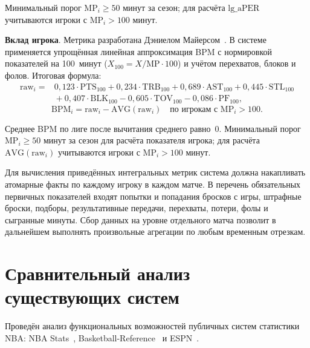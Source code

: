 Минимальный порог $\mathrm{MP}_i \ge 50$ минут за сезон; для расчёта
$\mathrm{lg\_aPER}$ учитываются игроки с $\mathrm{MP}_i > 100$ минут.

\textbf{Вклад игрока}. Метрика разработана Дэниелом
Майерсом~\cite{bpm1}. В системе применяется упрощённая линейная аппроксимация BPM
с нормировкой показателей на 100~минут ($X_{100} = X / \mathrm{MP} \cdot 100$)
и учётом перехватов, блоков и фолов. Итоговая формула:
\begin{equation}
\begin{split}
\mathrm{raw}_i = {}& 0{,}123 \cdot \mathrm{PTS}_{100}
               + 0{,}234 \cdot \mathrm{TRB}_{100}
               + 0{,}689 \cdot \mathrm{AST}_{100}
               + 0{,}445 \cdot \mathrm{STL}_{100} \\
               &{} + 0{,}407 \cdot \mathrm{BLK}_{100}
               - 0{,}605 \cdot \mathrm{TOV}_{100}
               - 0{,}086 \cdot \mathrm{PF}_{100},
\end{split}
\end{equation}
\begin{equation}
\mathrm{BPM}_i = \mathrm{raw}_i - \mathrm{AVG}(\mathrm{raw}_i)
\quad\text{по игрокам с }\mathrm{MP}_i > 100.
\end{equation}

Среднее BPM по лиге после вычитания среднего равно~0. Минимальный порог
$\mathrm{MP}_i \ge 50$ минут за сезон для расчёта показателя игрока; для
расчёта $\mathrm{AVG}(\mathrm{raw}_i)$ учитываются игроки с
$\mathrm{MP}_i > 100$ минут.

Для вычисления приведённых интегральных метрик система должна накапливать
атомарные факты по каждому игроку в каждом матче. В перечень обязательных
первичных показателей входят попытки и попадания бросков с игры, штрафные
броски, подборы, результативные передачи, перехваты, потери, фолы
и сыгранные минуты. Сбор данных на уровне отдельного матча позволит
в дальнейшем выполнять произвольные агрегации по любым временным отрезкам.

\section{Сравнительный анализ существующих систем}

Проведён анализ функциональных возможностей публичных систем
статистики NBA: NBA Stats~\cite{nba-stats}, Basketball-Reference~\cite{bref}
и ESPN~\cite{espn}.

